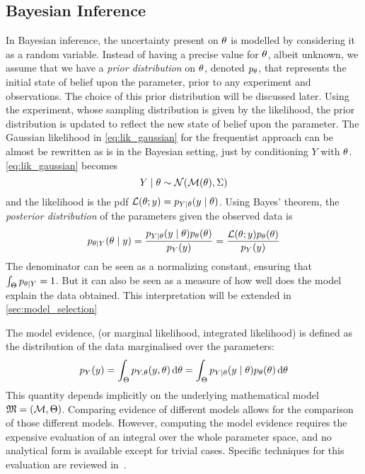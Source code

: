 \documentclass[../../Main_ManuscritThese.tex]{subfiles}
\begin{document}
\subsection{Bayesian Inference}
\label{sec:bayesian_inference_MAP}
In Bayesian inference, the uncertainty present on $\theta$ is modelled by
considering it as a random variable. Instead of having a precise value
for $\theta$, albeit unknown, we assume that we have a \emph{prior
  distribution} on $\theta$, denoted $p_{\theta}$, that represents the
initial state of belief upon the parameter, prior to any experiment
and observations. The choice of this prior distribution will be
discussed later.  Using the experiment, whose sampling distribution is
given by the likelihood, the prior distribution is updated to reflect
the new state of belief upon the parameter.  The Gaussian likelihood
in \cref{eq:lik_gaussian} for the frequentist approach can be almost
be rewritten as is in the Bayesian setting, just by conditioning $Y$
with $\theta$.  \cref{eq:lik_gaussian} becomes
\begin{equation}
  Y \mid  \theta \sim \mathcal{N}(\mathcal{M}(\theta), \Sigma)
\end{equation}
and the likelihood is the pdf
$\mathcal{L}(\theta;y) = p_{Y\mid \theta}(y \mid \theta)$.  Using Bayes'
theorem, the \emph{posterior distribution} of the parameters given the
observed data is
\begin{equation}
  \label{eq:bayes_posterior}
  p_{\theta \mid Y}(\theta \mid y) = \frac{p_{Y\mid \theta}(y \mid  \theta)p_{\theta}(\theta)}{p_Y(y)} = \frac{\mathcal{L}(\theta;y)p_{\theta}(\theta)}{p_Y(y)}
\end{equation}
The denominator can be seen as a normalizing constant, ensuring that
$\int_{\Theta} p_{\theta \mid Y} = 1$. But it can also be seen as a
measure of how well does the model explain the data obtained. This
interpretation will be extended in \cref{sec:model_selection}
\begin{definition}
\label{def:model_evidence}
The model evidence, (or marginal likelihood, integrated likelihood) is
defined as the distribution of the data marginalised over the
parameters:
  \begin{equation}
    \label{eq:model_evidence}
    p_Y(y) = \int_{\Theta}p_{Y,\theta}(y,\theta)\,\mathrm{d}\theta = \int_{\Theta}p_{Y \mid \theta}(y \mid \theta)p_{\theta}(\theta)\,\mathrm{d}\theta
  \end{equation}
  This quantity depends implicitly on the underlying mathematical
  model $\mathfrak{M} = (\mathcal{M},\Theta)$. Comparing evidence of
  different models allows for the comparison of those different
  models. However, computing the model evidence requires the expensive
  evaluation of an integral over the whole parameter space, and no
  analytical form is available except for trivial cases. Specific
  techniques for this evaluation are reviewed
  in~\cite{friel_estimating_2011}.
\end{definition}
\end{document}
